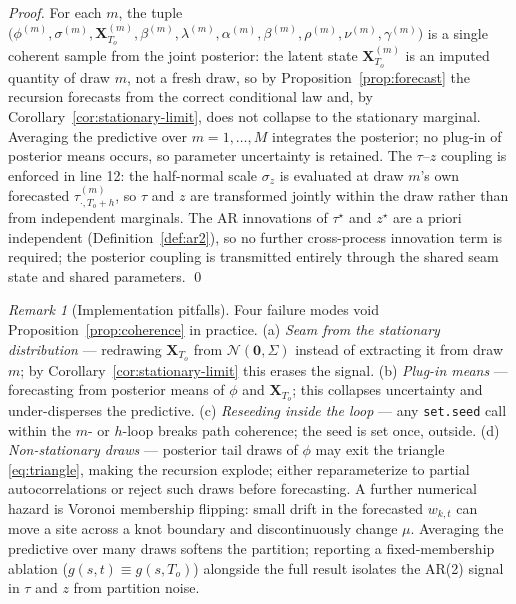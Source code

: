 \documentclass[11pt]{article}
\theoremstyle{definition}
\theoremstyle{remark}
\newtheorem{remark}{Remark}
\newcommand{\Norm}{\mathcal{N}}
\begin{document}
\begin{proof}
For each $m$, the tuple
$\big(\phi^{(m)}, \sigma^{(m)}, \bm X^{(m)}_{T_o},
       \beta^{(m)}, \lambda^{(m)}, \alpha^{(m)}, \beta^{(m)},
       \rho^{(m)}, \nu^{(m)}, \gamma^{(m)}\big)$
is a single coherent sample from the joint posterior: the latent state
$\bm X^{(m)}_{T_o}$ is an imputed quantity of draw $m$, not a fresh
draw, so by Proposition~\ref{prop:forecast} the recursion forecasts
from the correct conditional law and, by
Corollary~\ref{cor:stationary-limit}, does not collapse to the
stationary marginal. Averaging the predictive over $m=1,\dots,M$
integrates the posterior; no plug-in of posterior means occurs, so
parameter uncertainty is retained. The $\tau$--$z$ coupling is enforced
in line 12: the half-normal scale $\sigma_z$ is evaluated at draw $m$'s
own forecasted $\tau^{(m)}_{\cdot,T_o+h}$, so $\tau$ and $z$ are
transformed jointly within the draw rather than from independent
marginals. The AR innovations of $\tau^\star$ and $z^\star$ are a priori
independent (Definition~\ref{def:ar2}), so no further cross-process
innovation term is required; the posterior coupling is transmitted
entirely through the shared seam state and shared parameters. \qed
\end{proof}

\begin{remark}[Implementation pitfalls]
\label{rem:pitfalls}
Four failure modes void Proposition~\ref{prop:coherence} in practice.
(a) \emph{Seam from the stationary distribution} --- redrawing
$\bm X_{T_o}$ from $\Norm(\bm 0,\Sigma)$ instead of extracting it from
draw $m$; by Corollary~\ref{cor:stationary-limit} this erases the
signal.
(b) \emph{Plug-in means} --- forecasting from posterior means of
$\phi$ and $\bm X_{T_o}$; this collapses uncertainty and under-disperses
the predictive.
(c) \emph{Reseeding inside the loop} --- any \texttt{set.seed} call
within the $m$- or $h$-loop breaks path coherence; the seed is set once,
outside.
(d) \emph{Non-stationary draws} --- posterior tail draws of $\phi$ may
exit the triangle \eqref{eq:triangle}, making the recursion explode;
either reparameterize to partial autocorrelations or reject such draws
before forecasting.
A further numerical hazard is Voronoi membership flipping: small drift
in the forecasted $w_{k,t}$ can move a site across a knot boundary and
discontinuously change $\mu$. Averaging the predictive over many draws
softens the partition; reporting a fixed-membership ablation
($g(s,t)\equiv g(s,T_o)$) alongside the full result isolates the AR(2)
signal in $\tau$ and $z$ from partition noise.
\end{remark}
\end{document}

